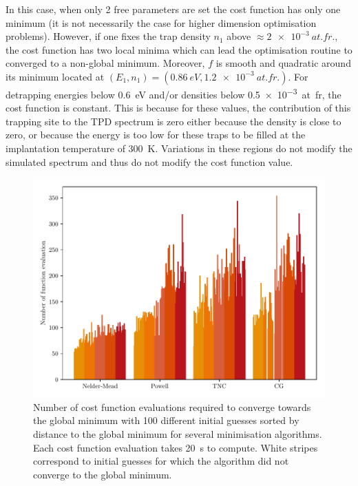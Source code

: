 In this case, when only 2 free parameters are set the cost function has only one minimum (it is not necessarily the case for higher dimension optimisation problems).
However, if one fixes the trap density $n_1$ above $\approx \SI{2e-3}{at.fr.}$, the cost function has two local minima which can lead the optimisation routine to converged to a non-global minimum.
Moreover, $f$ is smooth and quadratic around its minimum located at $(E_1, n_1) = (\SI{0.86}{eV}, \SI{1.2e-3}{at.fr.})$.
For detrapping energies below \SI{0.6}{eV} and/or densities below \SI{0.5e-3}{at.fr}, the cost function is constant.
This is because for these values, the contribution of this trapping site to the TPD spectrum is zero either because the density is close to zero, or because the energy is too low for these traps to be filled at the implantation temperature of \SI{300}{K}.
Variations in these regions do not modify the simulated spectrum and thus do not modify the cost function value.

\begin{figure} [ht]
    \centering
    \includegraphics[width=\linewidth]{Figures/Chapter3/Parametric_optimisation/algorithms_perfs.pdf}
    \caption{Number of cost function evaluations required to converge towards the global minimum with 100 different initial guesses sorted by distance to the global minimum for several minimisation algorithms. Each cost function evaluation takes \SI{20}{s} to compute. White stripes correspond to initial guesses for which the algorithm did not converge to the global minimum.}
    \label{fig:algos perfs}
\end{figure}


